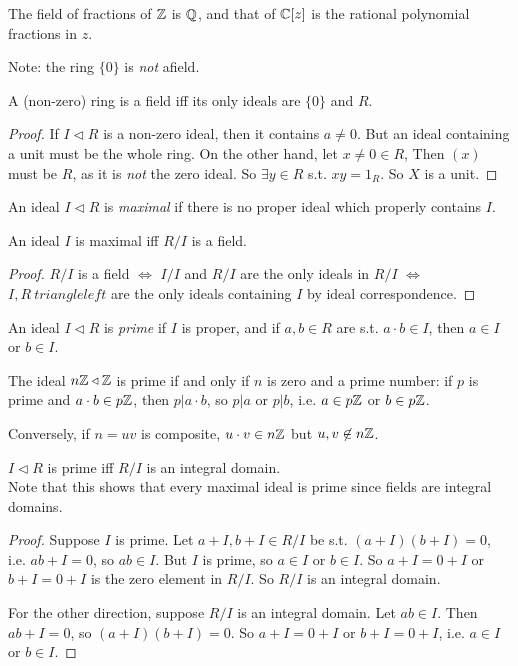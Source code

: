 \documentclass[a4paper]{article}
\begin{document}
\begin{eg}
The field of fractions of $\mathbb{Z}$ is $\mathbb{Q}$, and that of $\mathbb{C}[z]$ is the rational polynomial fractions in $z$.
\end{eg}

Note: the ring $\{0\}$ is \emph{not} afield.

\begin{lemma}
A (non-zero) ring is a field iff its only ideals are $\{0\}$ and $R$.
\begin{proof}
If $I \triangleleft R$ is a non-zero ideal, then it contains $a \neq 0$. But an ideal containing a unit must be the whole ring. On the other hand, let $x \neq 0 \in R$, Then $(x)$ must be $R$, as it is \emph{not} the zero ideal. So $\exists y \in R$ s.t. $xy = 1_R$. So $X$ is a unit.
\end{proof}
\end{lemma}

\begin{defi}
An ideal $I \triangleleft R$ is \emph{maximal} if there is no proper ideal which properly contains $I$.
\end{defi}

\begin{lemma}
An ideal $I$ is maximal iff $R/I$ is a field.
\begin{proof}
$R/I$ is a field $\iff$ $I/I$ and $R/I$ are the only ideals in $R/I$ $\iff$ $I,R\ triangleleft$ are the only ideals containing $I$ by ideal correspondence.
\end{proof}
\end{lemma}

\begin{defi}
An ideal $I \triangleleft R$ is \emph{prime} if $I$ is proper, and if $a,b \in R$ are s.t. $a \cdot b \in I$, then $a\in I$ or $b \in I$.
\end{defi}

\begin{eg}
The ideal $n\mathbb{Z} \triangleleft \mathbb{Z}$ is prime if and only if $n$ is zero and a prime number: if $p$ is prime and $a \cdot b \in p\mathbb{Z}$, then $p | a \cdot b$, so $p|a$ or $p|b$, i.e. $a \in p\mathbb{Z}$ or $b \in p\mathbb{Z}$.

Conversely, if $n=uv$ is composite, $u\cdot v \in n\mathbb{Z}$ but $u,v \not\in n\mathbb{Z}$.
\end{eg}

\begin{lemma}
$I \triangleleft R$ is prime iff $R/I$ is an integral domain.\\
Note that this shows that every maximal ideal is prime since fields are integral domains.
\end{lemma}
\begin{proof}
Suppose $I$ is prime. Let $a+I,b+I \in R/I$ be s.t. $(a+I)(b+I) = 0$, i.e. $ab+I=0$, so $ab \in I$. But $I$ is prime, so $a \in I$ or $b \in I$. So $a+I = 0+I$ or $b+I = 0+I$ is the zero element in $R/I$. So $R/I$ is an integral domain.

For the other direction, suppose $R/I$ is an integral domain. Let $ab \in I$. Then $ab+I = 0$, so $(a+I)(b+I)=0$. So $a+I = 0+I$ or $b+I = 0+I$, i.e. $a \in I$ or $b \in I$.
\end{proof}
\end{document}
